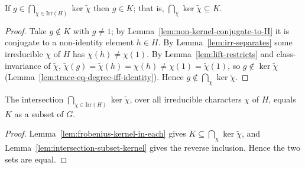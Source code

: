 \begin{lemma}
    \label{lem:intersection-subset-kernel}
    \leanok
    If $g \in \bigcap_{\chi \in \mathrm{Irr}(H)} \ker \widetilde{\chi}$ then $g \in
    K$; that is, $\bigcap_\chi \ker\widetilde\chi \subseteq K$.
\end{lemma}
\begin{proof}
    Take $g \notin K$ with $g \neq 1$; by
    Lemma~\ref{lem:non-kernel-conjugate-to-H} it is conjugate to a non-identity
    element $h \in H$. By Lemma~\ref{lem:irr-separates} some irreducible $\chi$ of
    $H$ has $\chi(h) \neq \chi(1)$. By Lemma~\ref{lem:lift-restricts} and
    class-invariance of $\widetilde\chi$, $\widetilde\chi(g) = \widetilde\chi(h) =
    \chi(h) \neq \chi(1) = \widetilde\chi(1)$, so $g \notin \ker\widetilde\chi$
    (Lemma~\ref{lem:trace-eq-degree-iff-identity}). Hence $g \notin \bigcap_\chi
    \ker\widetilde\chi$.
\end{proof}

\begin{lemma}
    \label{lem:intersection-equals-kernel}
    \leanok
    The intersection $\bigcap_{\chi \in \mathrm{Irr}(H)} \ker \widetilde{\chi}$,
    over all irreducible characters $\chi$ of $H$, equals $K$ as a subset of $G$.
\end{lemma}
\begin{proof}
    Lemma~\ref{lem:frobenius-kernel-in-each} gives $K \subseteq \bigcap_\chi \ker
    \widetilde{\chi}$, and Lemma~\ref{lem:intersection-subset-kernel} gives the
    reverse inclusion. Hence the two sets are equal.
\end{proof}

